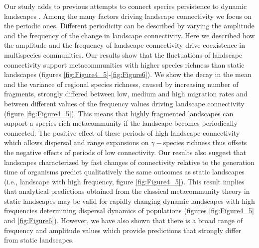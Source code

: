 \documentclass[a4paper,12pt]{article}
\begin{document}
Our study adds to previous attempts to connect species persistence to dynamic landscapes \citep{Hanski1999, keymeretal2000}. Among the many factors driving landscape connectivity we focus on the periodic ones. Different periodicity can be described by varying the amplitude and the frequency of the change in landscape connectivity. Here we described how the amplitude and the frequency of landscape connectivity drive coexistence in multispecies communities. Our results show that the fluctuations of landscape connectivity support metacommunities with higher species richness than static landscapes (figures \ref{fig:Figure4_5}-\ref{fig:Figure6}). We show the decay in the mean and the variance of regional species richness, caused by increasing number of fragments, strongly differed between low, medium and high migration rates and between different values of the frequency values driving landscape connectivity (figure \ref{fig:Figure4_5}). This means that highly fragmented landscapes can support a species rich metacommunity if the landscape becomes periodically connected. The positive effect of these periods of high landscape connectivity which allows dispersal and range expansions on $\gamma-$species richness thus offsets the negative effects of periods of low connectivity. Our results also suggest that landscapes characterized by fast changes of connectivity relative to the generation time of organisms predict qualitatively the same outcomes as static landscapes (i.e., landscape with high frequency, figure \ref{fig:Figure4_5}). This result implies that analytical predictions obtained from the classical metacommunity theory in static landscapes may be valid for rapidly changing dynamic landscapes with high frequencies determining dispersal dynamics of populations (figures \ref{fig:Figure4_5} and \ref{fig:Figure6}). However, we have also shown that there is a broad range of frequency and amplitude values which provide predictions that strongly differ from static landscapes.
\end{document}
